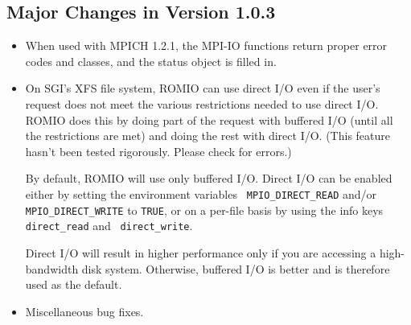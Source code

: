 \subsection{Major Changes in Version 1.0.3}
\begin{itemize}
\item When used with MPICH 1.2.1, the MPI-IO functions return proper
error codes and classes, and the status object is filled in.

\item On SGI's XFS file system, ROMIO can use direct I/O even if the
user's request does not meet the various restrictions needed to use
direct I/O. ROMIO does this by doing part of the request with buffered
I/O (until all the restrictions are met) and doing the rest with
direct I/O. (This feature hasn't been tested rigorously. Please check
for errors.)

By default, ROMIO will use only buffered I/O. Direct I/O can be
enabled either by setting the environment variables {\tt
MPIO\_DIRECT\_READ} and/or {\tt MPIO\_DIRECT\_WRITE} to {\tt TRUE}, or
on a per-file basis by using the info keys {\tt direct\_read} and {\tt
direct\_write}.

Direct I/O will result in higher performance only if you are accessing
a high-bandwidth disk system. Otherwise, buffered I/O is better and is
therefore used as the default.

\item Miscellaneous bug fixes.
\end{itemize}

